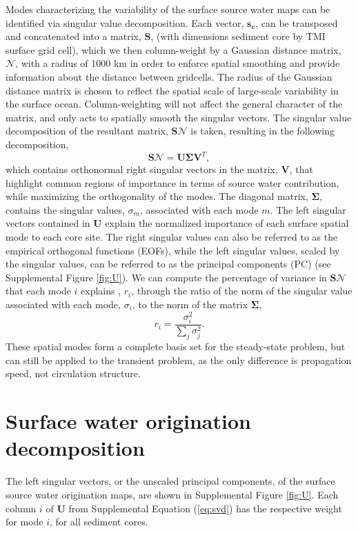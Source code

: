 \documentclass[draft]{agujournal2019}
\begin{document}
Modes characterizing the variability of the surface source water maps can be identified via singular value decomposition. Each vector, $\mathbf{s_{c}}$, can be transposed and concatenated into a matrix, $\mathbf{S}$, (with dimensions sediment core by TMI surface grid cell), which we then column-weight by a Gaussian distance matrix, $\bm{\mathcal{N}}$, with a radius of 1000 km in order to enforce spatial smoothing and provide information about the distance between gridcells. The radius of the Gaussian distance matrix is chosen to reflect the spatial scale of large-scale variability in the surface ocean. Column-weighting will not affect the general character of the matrix, and only acts to spatially smooth the singular vectors. The singular value decomposition of the resultant matrix, $\bm{S \mathcal{N}}$ is taken, resulting in the following decomposition,
\begin{equation}
\label{eq:svd}
\bm{S \mathcal{N}} = \mathbf{U\Sigma} \mathbf{V}^{T},
\end{equation}
which contains orthonormal right singular vectors in the matrix, $\mathbf{V}$, that highlight common regions of importance in terms of source water contribution, while maximizing the orthogonality of the modes. The diagonal matrix, $\mathbf{\Sigma}$, contains the singular values, $\sigma_m$, associated with each mode $m$. The left singular vectors contained in $\mathbf{U}$ explain the normalized importance of each surface spatial mode to each core site. The right singular values can also be referred to as the empirical orthogonal functions (EOFs), while the left singular values, scaled by the singular values, can be referred to as the principal components (PC) (see Supplemental Figure \ref{fig:U}). We can compute the percentage of variance in $\bm{S\mathcal{N}}$ that each mode $i$ explains \cite{Hannachi-Jolliffe-2007:Empirical}, $r_i$, through the ratio of the norm of the singular value associated with each mode, $\sigma_i$, to the norm of the matrix $\mathbf{\Sigma}$, 
\begin{equation}
\label{eq:pervar}
r_i = \frac{\sigma_i^2}{\sum_{j} \sigma_{j}^{2}}.
\end{equation}
These spatial modes form a complete basis set for the steady-state problem, but can still be applied to the transient problem, as the only difference is propagation speed, not circulation structure.

\section{Surface water origination decomposition}
The left singular vectors, or the unscaled principal components, of the surface source water origination maps, are shown in Supplemental Figure \ref{fig:U}. Each column $i$ of $\mathbf{U}$ from Supplemental Equation (\ref{eq:svd}) has the respective weight for mode $i$, for all sediment cores.
\end{document}
